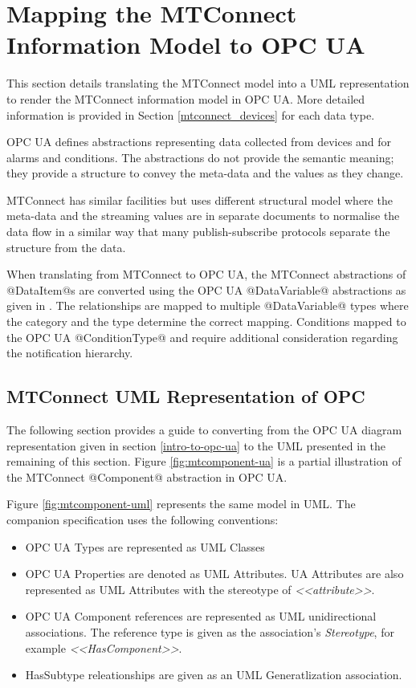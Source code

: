 \section{Mapping the MTConnect Information Model to OPC UA} 
  \label{mtconnect-mapping}
\DefineShortVerb{\@}

This section details translating the MTConnect model into a UML representation to render the MTConnect information model in OPC UA. More detailed information is provided in Section \ref{mtconnect_devices} for each data type.

OPC UA defines abstractions representing data collected from devices and for alarms and conditions. The abstractions do not provide the semantic meaning; they provide a structure to convey the meta-data and the values as they change. 

MTConnect has similar facilities but uses different structural model where the meta-data and the streaming values are in separate documents to normalise the data flow in a similar way that many publish-subscribe protocols separate the structure from the data.

When translating from MTConnect to OPC UA, the MTConnect abstractions of @DataItem@s are converted using the OPC UA  @DataVariable@ abstractions as given in \cite{UAPart8}.  The relationships are mapped to multiple @DataVariable@ types where the category and the type determine the correct mapping. Conditions mapped to the OPC UA @ConditionType@ and require additional consideration regarding the notification hierarchy. 

\subsection{MTConnect UML Representation of OPC}

The following section provides a guide to converting from the OPC UA diagram representation given in section \ref{intro-to-opc-ua} to the UML presented in the remaining of this section. Figure \ref{fig:mtcomponent-ua} is a partial illustration of the MTConnect @Component@ abstraction in OPC UA.



Figure \ref{fig:mtcomponent-uml} represents the same model in UML. The companion specification uses the following conventions:

\begin{itemize}
\item OPC UA Types are represented as UML Classes
\item OPC UA Properties are denoted as UML Attributes. UA Attributes are also represented as UML Attributes with the stereotype of \textit{<<attribute>>}.
\item OPC UA Component references are represented as UML unidirectional associations. The reference type is given as the association's \textit{Stereotype}, for example \textit{<<HasComponent>>}. 
\item HasSubtype releationships are given as an UML Generatlization association.  
\end{itemize}

